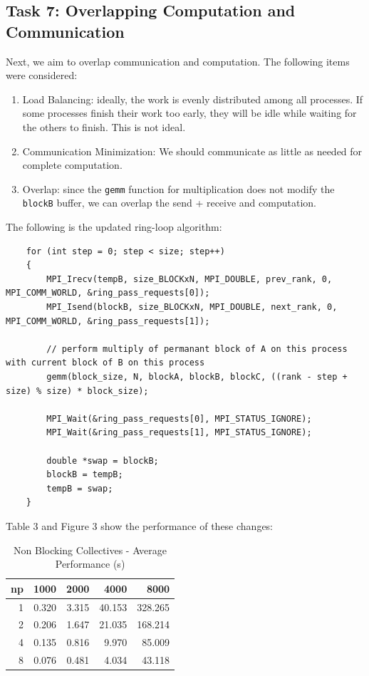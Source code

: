 \documentclass{article}
\begin{document}
\subsection*{Task 7: Overlapping Computation and Communication}
Next, we aim to overlap communication and computation. The following items were considered:
\begin{enumerate}
    \item Load Balancing: ideally, the work is evenly distributed among all 
    processes. If some processes finish their work too early, they will be idle while 
    waiting for the others to finish. This is not ideal.
    \item Communication Minimization: We should communicate as little as needed for complete computation.
    \item Overlap: since the \texttt{gemm} function for multiplication does not modify the \texttt{blockB} buffer, 
    we can overlap the send + receive and computation.
\end{enumerate}
The following is the updated ring-loop algorithm:
\begin{lstlisting}
    for (int step = 0; step < size; step++)
    {
        MPI_Irecv(tempB, size_BLOCKxN, MPI_DOUBLE, prev_rank, 0, MPI_COMM_WORLD, &ring_pass_requests[0]);
        MPI_Isend(blockB, size_BLOCKxN, MPI_DOUBLE, next_rank, 0, MPI_COMM_WORLD, &ring_pass_requests[1]);

        // perform multiply of permanant block of A on this process with current block of B on this process
        gemm(block_size, N, blockA, blockB, blockC, ((rank - step + size) % size) * block_size);

        MPI_Wait(&ring_pass_requests[0], MPI_STATUS_IGNORE);
        MPI_Wait(&ring_pass_requests[1], MPI_STATUS_IGNORE);

        double *swap = blockB;
        blockB = tempB;
        tempB = swap;
    }
\end{lstlisting}
Table 3 and Figure 3 show the performance of these changes:
\begin{table}[H]
    \centering
    \caption{Non Blocking Collectives - Average Performance (s)}
    \fontsize{12}{14}\selectfont
    \begin{tabular}[t]{rrrrr}
    \toprule
    np & 1000 & 2000 & 4000 & 8000\\
    \midrule
    1 & 0.320 & 3.315 & 40.153 & 328.265\\
    2 & 0.206 & 1.647 & 21.035 & 168.214\\
    4 & 0.135 & 0.816 & 9.970 & 85.009\\
    8 & 0.076 & 0.481 & 4.034 & 43.118\\
    \bottomrule
    \end{tabular}
\end{table}
\end{document}
